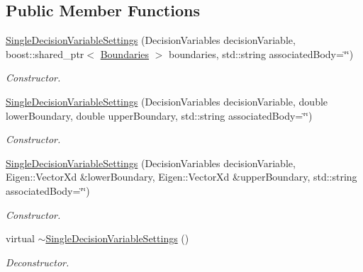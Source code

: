 \subsection*{Public Member Functions}
\begin{DoxyCompactItemize}
\item 
\hyperlink{structtudat_1_1optimization_1_1SingleDecisionVariableSettings_a288f5ffb43b7d0e110b6d8070c9b7026}{Single\+Decision\+Variable\+Settings} (Decision\+Variables decision\+Variable, boost\+::shared\+\_\+ptr$<$ \hyperlink{structtudat_1_1optimization_1_1Boundaries}{Boundaries} $>$ boundaries, std\+::string associated\+Body=\char`\"{}\char`\"{})
\begin{DoxyCompactList}\small\item\em Constructor. \end{DoxyCompactList}\item 
\hyperlink{structtudat_1_1optimization_1_1SingleDecisionVariableSettings_aebb0b4ab8770b096427e239495da7237}{Single\+Decision\+Variable\+Settings} (Decision\+Variables decision\+Variable, double lower\+Boundary, double upper\+Boundary, std\+::string associated\+Body=\char`\"{}\char`\"{})
\begin{DoxyCompactList}\small\item\em Constructor. \end{DoxyCompactList}\item 
\hyperlink{structtudat_1_1optimization_1_1SingleDecisionVariableSettings_a8650aa02bd66fb8e235cc23cf1d53840}{Single\+Decision\+Variable\+Settings} (Decision\+Variables decision\+Variable, Eigen\+::\+Vector\+Xd \&lower\+Boundary, Eigen\+::\+Vector\+Xd \&upper\+Boundary, std\+::string associated\+Body=\char`\"{}\char`\"{})
\begin{DoxyCompactList}\small\item\em Constructor. \end{DoxyCompactList}\item 
virtual \hyperlink{structtudat_1_1optimization_1_1SingleDecisionVariableSettings_ac51b14954a7fd9a7fc434052da532807}{$\sim$\+Single\+Decision\+Variable\+Settings} ()\hypertarget{structtudat_1_1optimization_1_1SingleDecisionVariableSettings_ac51b14954a7fd9a7fc434052da532807}{}\label{structtudat_1_1optimization_1_1SingleDecisionVariableSettings_ac51b14954a7fd9a7fc434052da532807}

\begin{DoxyCompactList}\small\item\em Deconstructor. \end{DoxyCompactList}\end{DoxyCompactItemize}
